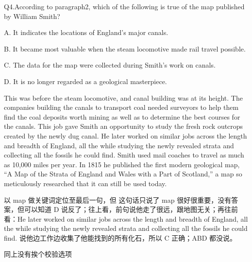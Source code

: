 \begin{blk}
    \begin{qst}
        Q4.According to paragraph2, which of the following is true of the map published by William Smith?
    \end{qst}

    \begin{chc}
        A. It indicates the locations of England's major canals.

        B. It became most valuable when the steam locomotive made rail travel possible.

        C. The data for the map were collected during Smith’s work on canals.

        D. It is no longer regarded as a geological masterpiece.
    \end{chc}

    \begin{psgq}
        This was before the steam locomotive, and canal building was at its height. The companies building the canals to transport coal needed surveyors to help them find the coal deposits worth mining as well as to determine the best courses for the canals. This job gave Smith an opportunity to study the fresh rock outcrops created by the newly dug canal. He later worked on similar jobs across the length and breadth of England, all the while studying the newly revealed strata and collecting all the fossils he could find. Smith used mail coaches to travel as much as 10,000 miles per year. In 1815 he published the first modern geological map, “A Map of the Strata of England and Wales with a Part of Scotland,” a map so meticulously researched that it can still be used today.
    \end{psgq}

    \begin{nlz}
        以 map 做关键词定位至最后一句，但 这句话只说了 map 很好很重要，没有答案，但可以知道 D 说反了；往上看，前句说他走了很远，跟地图无关；再往前看：He later worked on similar jobs across the length and breadth of England, all the while studying the newly revealed strata and collecting all the fossils he could find. 说他边工作边收集了他能找到的所有化石，所以 C 正确；ABD 都没说。

        同上没有挨个校验选项
    \end{nlz}
\end{blk}


